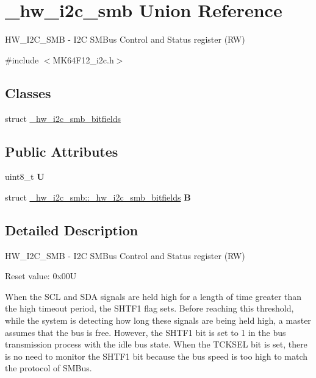 \hypertarget{union__hw__i2c__smb}{}\section{\+\_\+hw\+\_\+i2c\+\_\+smb Union Reference}
\label{union__hw__i2c__smb}


H\+W\+\_\+\+I2\+C\+\_\+\+S\+MB -\/ I2C S\+M\+Bus Control and Status register (RW)  




{\ttfamily \#include $<$M\+K64\+F12\+\_\+i2c.\+h$>$}

\subsection*{Classes}
\begin{DoxyCompactItemize}
\item 
struct \hyperlink{struct__hw__i2c__smb_1_1__hw__i2c__smb__bitfields}{\+\_\+hw\+\_\+i2c\+\_\+smb\+\_\+bitfields}
\end{DoxyCompactItemize}
\subsection*{Public Attributes}
\begin{DoxyCompactItemize}
\item 
uint8\+\_\+t {\bfseries U}\hypertarget{union__hw__i2c__smb_a0f6437daa345ffb5d74952ca6fddfdf3}{}\label{union__hw__i2c__smb_a0f6437daa345ffb5d74952ca6fddfdf3}

\item 
struct \hyperlink{struct__hw__i2c__smb_1_1__hw__i2c__smb__bitfields}{\+\_\+hw\+\_\+i2c\+\_\+smb\+::\+\_\+hw\+\_\+i2c\+\_\+smb\+\_\+bitfields} {\bfseries B}\hypertarget{union__hw__i2c__smb_aa4e9e0618340e6e852ba8e91ac4d1740}{}\label{union__hw__i2c__smb_aa4e9e0618340e6e852ba8e91ac4d1740}

\end{DoxyCompactItemize}


\subsection{Detailed Description}
H\+W\+\_\+\+I2\+C\+\_\+\+S\+MB -\/ I2C S\+M\+Bus Control and Status register (RW) 

Reset value\+: 0x00U

When the S\+CL and S\+DA signals are held high for a length of time greater than the high timeout period, the S\+H\+T\+F1 flag sets. Before reaching this threshold, while the system is detecting how long these signals are being held high, a master assumes that the bus is free. However, the S\+H\+T\+F1 bit is set to 1 in the bus transmission process with the idle bus state. When the T\+C\+K\+S\+EL bit is set, there is no need to monitor the S\+H\+T\+F1 bit because the bus speed is too high to match the protocol of S\+M\+Bus. 

